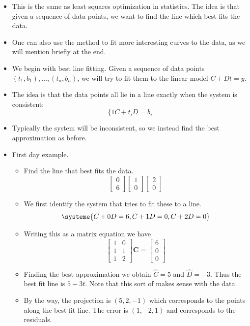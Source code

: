 \documentclass[11pt,oneside]{amsbook}
\theoremstyle{definition}
\theoremstyle{plain}
\theoremstyle{definition}
\theoremstyle{remark}
\numberwithin{equation}{section}
\numberwithin{figure}{section}
\begin{document}
\begin{itemize}
\item This is the same as least squares optimization in statistics. The idea is that given a sequence of data points, we want to find the line which best fits the data.
\item One can also use the method to fit more interesting curves to the data, as we will mention briefly at the end.
\item We begin with best line fitting. Given a sequence of data points $(t_1,b_1),\ldots,(t_n,b_n)$, we will try to fit them to the linear model $C+Dt=y$.
\item The idea is that the data points all lie in a line exactly when the system is consistent:
  \[\{1C+t_iD=b_i
  \]
\item Typically the system will be inconsistent, so we instead find the best approximation as before.
\item First day example.
  \begin{itemize}
  \item Find the line that best fits the data.
    \[\begin{bmatrix}0\\6\end{bmatrix}
      \begin{bmatrix}1\\0\end{bmatrix}
      \begin{bmatrix}2\\0\end{bmatrix}
    \]
  \item We first identify the system that tries to fit these to a line.
    \[\systeme{C+0D=6,C+1D=0,C+2D=0}
    \]
  \item Writing this as a matrix equation we have
    \[\begin{bmatrix}1&0\\1&1\\1&2\end{bmatrix}
      \mathbf{C}=\begin{bmatrix}6\\0\\0\end{bmatrix}
    \]
  \item Finding the best approximation we obtain $\hat C=5$ and $\hat D=-3$. Thus the best fit line is $5-3t$. Note that this sort of makes sense with the data.
  \item By the way, the projection is $(5,2,-1)$ which corresponds to the points along the best fit line. The error is $(1,-2,1)$ and corresponds to the residuals.

\end{itemize}
\end{itemize}
\end{document}

